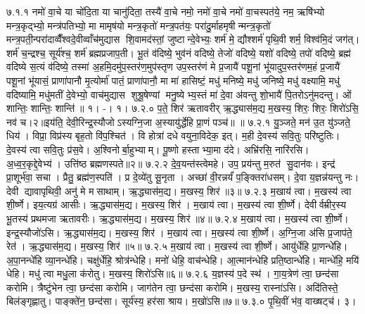 \setcounter{anuvakam}{0}
७.१.१
नमो॑ वा॒चे या चो॑दि॒ता या चानु॑दिता॒ तस्यै॑ वा॒चे नमो॒ नमो॑ वा॒चे नमो॑ वा॒चस्पत॑ये॒ नम॒ ऋषि॑भ्यो मन्त्र॒कृद्भ्यो॒ मन्त्र॑पतिभ्यो॒ मा मामृष॑यो मन्त्र॒कृतो॑ मन्त्र॒पत॑यः॒ परा॑दु॒र्माहमृषीन्मन्त्र॒कृतो॑ मन्त्र॒पती॒न्परा॑दाव्वैँश्वदे॒वीव्वाँच॑मुद्यास शि॒वामद॑स्तां॒ जुष्टान्दे॒वेभ्यः॒ शर्म॑ मे॒ द्यौश्शर्म॑ पृथि॒वी शर्म॒ विश्व॑मि॒दं जग॑त्। शर्म॑ च॒न्द्रश्च॒ सूर्य॑श्च॒ शर्म॑ ब्रह्मप्रजाप॒ती। भू॒तं व॑दिष्ये॒ भुव॑नं वदिष्ये॒ तेजो॑ वदिष्ये॒ यशो॑ वदिष्ये॒ तपो॑ वदिष्ये॒ ब्रह्म॑ वदिष्ये स॒त्यं व॑दिष्ये॒ तस्मा॑ अ॒हमि॒दमु॑प॒स्तर॑ण॒मुप॑स्तृण उप॒स्तर॑णं मे प्र॒जायै॑ पशू॒नां भू॑यादुप॒स्तर॑णम॒हं प्र॒जायै॑ पशू॒नां भू॑यासं॒ प्राणा॑पानौ मृ॒त्योर्मा॑ पातं॒ प्राणा॑पानौ॒ मा मा॑ हासिष्टं॒ मधु॑ मनिष्ये॒ मधु॑ जनिष्ये॒ मधु॑ वक्ष्यामि॒ मधु॑ वदिष्यामि॒ मधु॑मतीं दे॒वेभ्यो॒ वाच॑मुद्यास शुश्रू॒षेण्यां मनु॒ष्येभ्य॒स्तं मा॑ दे॒वा अ॑वन्तु शो॒भायै॑ पि॒तरोऽनु॑मदन्तु। ओं शान्तिः॒ शान्तिः॒ शान्ति॑॥ १। -। १।
७.२.०
प॒ते॒ शिर॑ ऋतावरीर् ऋ॒द्ध्यास॑म॒द्य म॒खस्य॒ शिरः॒ शिरः॒ शिरो॑ऽसि॒ नव॑ च।२॥इय॑ति॒ देवी॒रिन्द्र॒स्यौजोऽस्यग्नि॒जा अ॒स्यायु॑र्द्धेहि प्रा॒णं पञ्च॑॥ ॥
\anuvakamend
७.२.१
यु॒ञ्जते॒ मन॑ उ॒त यु॑ञ्जते॒ धिय॑। विप्रा॒ विप्र॑स्य बृह॒तो वि॑प॒श्चित॑। वि होत्रा॑ दधे वयुना॒विदेक॒ इत्। म॒ही दे॒वस्य॑ सवि॒तुः परि॑ष्टुतिः। दे॒वस्य॑ त्वा सवि॒तुः प्र॑स॒वे। अ॒श्विनोर्बा॒हुभ्याम्। पू॒ष्णो हस्ताभ्या॒मा द॑दे। अभ्रि॑रसि॒ नारि॑रसि। अ॒ध्व॒र॒कृद्दे॒वेभ्य॑। उत्ति॑ष्ठ ब्रह्मणस्पते॥२॥
७.२.२
दे॒व॒यन्त॑स्त्वेमहे। उप॒ प्रय॑न्तु म॒रुत॑ सु॒दान॑वः। इन्द्र॑ प्रा॒शूर्भ॑वा॒ सचा। प्रैतु॒ ब्रह्म॑ण॒स्पति॑। प्र दे॒व्ये॑तु सू॒नृता। अच्छा॑ वी॒रन्नर्यं॑ प॒ङ्क्तिरा॑धसम्। दे॒वा य॒ज्ञन्न॑यन्तु नः। देवी द्यावापृथिवी॒ अनु॑ मे मसाथाम्। ऋ॒द्ध्यास॑म॒द्य। म॒खस्य॒ शिर॑॥३॥
७.२.३
म॒खाय॑ त्वा। म॒खस्य॑ त्वा शी॒र्ष्णे। इय॒त्यग्र॑ आसीः। ऋ॒द्ध्यास॑म॒द्य। म॒खस्य॒ शिर॑। म॒खाय॑ त्वा। म॒खस्य॑ त्वा शी॒र्ष्णे। देवीर्वम्रीर॒स्य भू॒तस्य॑ प्रथमजा ऋतावरीः। ऋ॒द्ध्यास॑म॒द्य। म॒खस्य॒ शिर॑॥४॥
७.२.४
म॒खाय॑ त्वा। म॒खस्य॑ त्वा शी॒र्ष्णे। इन्द्र॒स्यौजो॑ऽसि। ऋ॒द्ध्यास॑म॒द्य। म॒खस्य॒ शिर॑। म॒खाय॑ त्वा। म॒खस्य॑ त्वा शी॒र्ष्णे। अ॒ग्नि॒जा अ॑सि प्र॒जाप॑ते॒ रेत॑। ऋ॒द्ध्यास॑म॒द्य। म॒खस्य॒ शिर॑॥५॥
७.२.५
म॒खाय॑ त्वा। म॒खस्य॑ त्वा शी॒र्ष्णे। आयु॑र्धेहि प्रा॒णन्धे॑हि। अ॒पा॒नन्धे॑हि व्या॒नन्धे॑हि। चक्षु॑र्धेहि॒ श्रोत्र॑न्धेहि। मनो॑ धेहि॒ वाच॑न्धेहि। आ॒त्मान॑न्धेहि प्रति॒ष्ठान्धे॑हि। मान्धे॑हि॒ मयि॑ धेहि। मधु॑ त्वा मधु॒ला क॑रोतु। म॒खस्य॒ शिरो॑ऽसि॥६॥
७.२.६
य॒ज्ञस्य॑ प॒दे स्थ॑। गा॒य॒त्रेण॑ त्वा॒ छन्द॑सा करोमि। त्रैष्टु॑भेन त्वा॒ छन्द॑सा करोमि। जाग॑तेन त्वा॒ छन्द॑सा करोमि। म॒खस्य॒ रास्ना॑ऽसि। अदि॑तिस्ते॒ बिल॑ङ्गृह्णातु। पाङ्क्ते॑न॒ छन्द॑सा। सूर्य॑स्य॒ हर॑सा श्राय। म॒खो॑ऽसि॥७॥
७.३.०
पृ॒थि॒वीं भ॑व॒ वाख्षट्च॑। ३।
